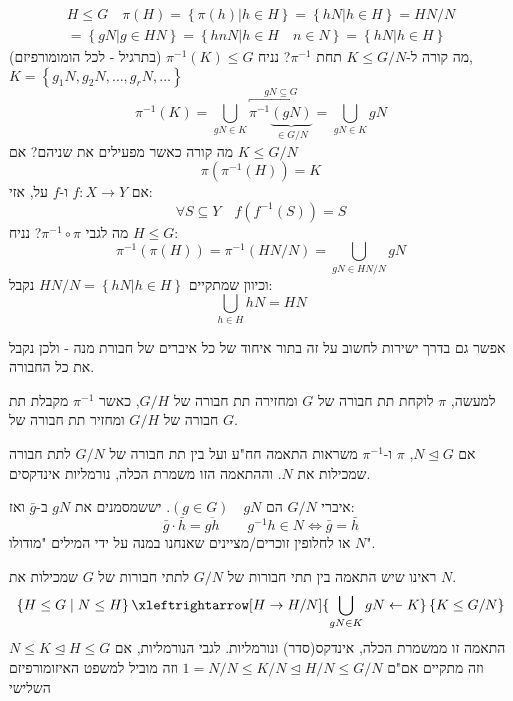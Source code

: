 \documentclass{tstextbook}
\begin{document}
\begin{gather*}H\leq G\quad \pi(H)=\left\{  \pi(h)|h\in H  \right\}=\left\{  hN | h\in H  \right\}=HN / N  \\= \left\{  gN |g\in HN  \right\}= \left\{  hnN | h \in H\quad n\in N  \right\}=\left\{  hN|h\in H  \right\}
\end{gather*}
מה קורה ל-\(K\leq G/N\) תחת \(\pi ^{-1}\)? נניח \(\pi ^{-1}(K)\leq G\) (בתרגיל - לכל הומומורפיזם), \(K=\left\{  g_{1}N,g_{2}N, \dots,g_{r}N, \dots  \right\}\)$$\pi ^{-1} (K)=\bigcup_{gN\in K} \overbracket{ \pi ^{-1} \underbrace{ (gN) }_{ \in G/N } }^{ gN\subseteq G }=\bigcup_{gN\in K}gN$$
מה קורה כאשר מפעילים את שניהם? אם \(K\leq G / N\)$$\pi\left( \pi ^{-1} (H) \right)=K$$
אם \(f:X\to Y\) ו-\(f\) על, אזי:
$$\forall S\subseteq Y\quad f(f^{-1} (S))=S$$
מה לגבי \(\pi ^{-1} \circ \pi\)? נניח \(H\leq G\):
$$\pi ^{-1} \left( \pi(H) \right)=\pi ^{-1} (HN / N)=\bigcup_{gN\in HN / N} gN $$
וכיוון שמתקיים \(HN / N=\left\{  hN | h\in H  \right\}\) נקבל:
$$\bigcup_{h \in H} hN=HN$$

\begin{remark}
אפשר גם בדרך ישירות לחשוב על זה בתור איחוד של כל איברים של חבורת מנה - ולכן נקבל את כל החבורה.

\end{remark}
למעשה, \(\pi\) לוקחת תת חבורה של \(G\) ומחזירה תת חבורה של \(G / H\), כאשר \(\pi ^{-1}\) מקבלת תת חבורה של \(G / H\) ומחזיר תת חבורה של \(G\).

\begin{theorem}
אם \(N\trianglelefteq G\), \(\pi\) ו-\(\pi ^{-1}\) משראות התאמה חח"ע ועל בין תת חבורה של \(G / N\) לתת חבורה שמכילות את \(N\). וההתאמה הזו משמרת הכלה, נורמליות אינדקסים.

\end{theorem}
\begin{symbolize}
איברי \(G / N\) הם \(\left( g\in G \right)\quad gN\). יששמסמנים את \(gN\) ב-\(\bar{g}\) ואז:
$$\bar{g}\cdot \bar{h}=\overline{gh}\qquad g^{-1} h\in N\iff \bar{g}=\bar{h}$$
או לחלופין זוכרים/מציינים שאנחנו במנה על ידי המילים "מודולו \(N\)".

\end{symbolize}
ראינו שיש התאמה בין תתי חבורות של \(G/N\) לתתי חבורות של \(G\) שמכילות את \(N\).
$$\left\{  H\leq G \mid N\leq H  \right\}\xleftrightarrow[H\to H/N  ]{\bigcup_{gN\in K} gN\leftarrow K} \left\{  K\leq G / N \right\}$$
התאמה זו ממשמרת הכלה, אינדקס(סדר) ונורמליות. לגבי הנורמליות, אם \(N\leq K\trianglelefteq H\leq G\) וזה מתקיים אם"ם \(1=N / N\leq K / N \trianglelefteq H / N \leq G / N\) וזה מוביל למשפט האיזומורפיזם השלישי
\end{document}
